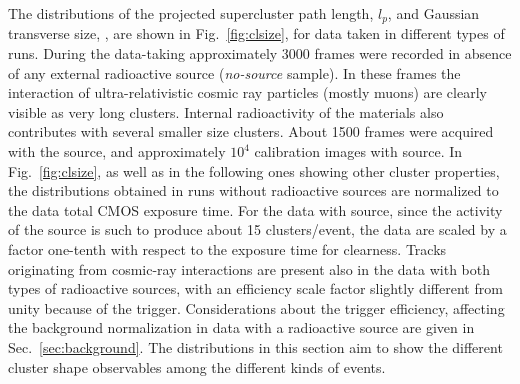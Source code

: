 The distributions of the projected supercluster path length, $l_p$,
and Gaussian transverse size, \tsigmag, are shown in
Fig.~\ref{fig:clsize}, for data taken in different types of runs.
During the data-taking approximately 3000 frames were recorded in
absence of any external radioactive source ({\it no-source}
sample). In these frames the interaction of ultra-relativistic cosmic
ray particles (mostly muons) are clearly visible as very long
clusters. Internal radioactivity of the \lemon materials also
contributes with several smaller size clusters. About 1500 frames were
acquired with the \ambe source, and approximately $10^4$ calibration
images with \fe source. In Fig.~\ref{fig:clsize}, as well as in the
following ones showing other cluster properties, the distributions
obtained in runs without radioactive sources are normalized to
the \ambe data total CMOS exposure time. For the data with \fe source,
since the activity of the source is such to produce about 15
clusters/event, the data are scaled by a factor one-tenth with respect
to the \ambe exposure time for clearness. Tracks originating from
cosmic-ray interactions are present also in the data with both types
of radioactive sources, with an efficiency scale factor slightly
different from unity because of the trigger. Considerations about the
trigger efficiency, affecting the background normalization in data
with a radioactive source are given in Sec.~\ref{sec:background}. The
distributions in this section aim to show the different cluster shape
observables among the different kinds of events.

